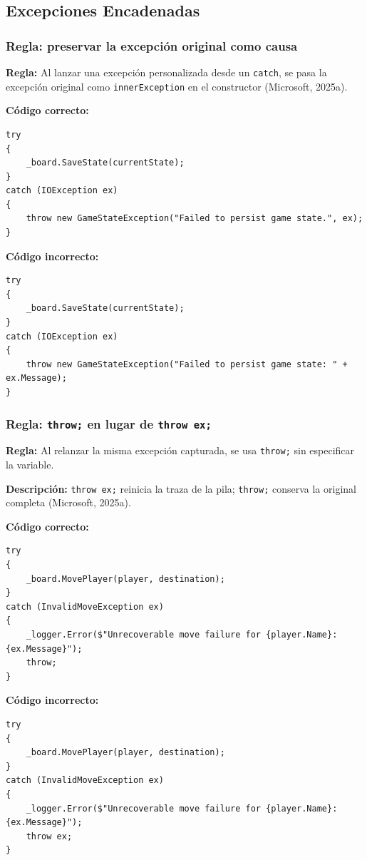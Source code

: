 \subsection{Excepciones Encadenadas}

\subsubsection{Regla: preservar la excepción original como causa}

\textbf{Regla:} Al lanzar una excepción personalizada desde un \texttt{catch}, se pasa la excepción original como \texttt{innerException} en el constructor (Microsoft, 2025a).

\textbf{Código correcto:}
\begin{lstlisting}[style=csharpstyle]
try
{
    _board.SaveState(currentState);
}
catch (IOException ex)
{
    throw new GameStateException("Failed to persist game state.", ex);
}
\end{lstlisting}

\textbf{Código incorrecto:}
\begin{lstlisting}[style=csharpstyle]
try
{
    _board.SaveState(currentState);
}
catch (IOException ex)
{
    throw new GameStateException("Failed to persist game state: " + ex.Message);
}
\end{lstlisting}

\subsubsection{Regla: \texttt{throw;} en lugar de \texttt{throw ex;}}

\textbf{Regla:} Al relanzar la misma excepción capturada, se usa \texttt{throw;} sin especificar la variable.

\textbf{Descripción:} \texttt{throw ex;} reinicia la traza de la pila; \texttt{throw;} conserva la original completa (Microsoft, 2025a).

\textbf{Código correcto:}
\begin{lstlisting}[style=csharpstyle]
try
{
    _board.MovePlayer(player, destination);
}
catch (InvalidMoveException ex)
{
    _logger.Error($"Unrecoverable move failure for {player.Name}: {ex.Message}");
    throw;
}
\end{lstlisting}

\textbf{Código incorrecto:}
\begin{lstlisting}[style=csharpstyle]
try
{
    _board.MovePlayer(player, destination);
}
catch (InvalidMoveException ex)
{
    _logger.Error($"Unrecoverable move failure for {player.Name}: {ex.Message}");
    throw ex;
}
\end{lstlisting}
